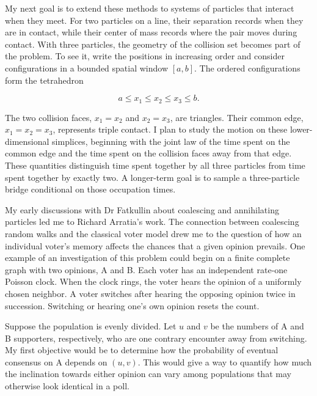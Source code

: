 \documentclass[12pt,letterpaper]{article}
\begin{document}
\newpage
My next goal is to extend these methods to systems of particles that interact when they meet. For two particles on a line, their separation records when they are in contact, while their center of mass records where the pair moves during contact. With three particles, the geometry of the collision set becomes part of the problem. To see it, write the positions in increasing order and consider configurations in a bounded spatial window \([a,b]\). The ordered configurations form the tetrahedron

\[
a\leq x_1\leq x_2\leq x_3\leq b.
\]

The two collision faces, \(x_1=x_2\) and \(x_2=x_3\), are triangles. Their common edge, \(x_1=x_2=x_3\), represents triple contact. I plan to study the motion on these lower-dimensional simplices, beginning with the joint law of the time spent on the common edge and the time spent on the collision faces away from that edge. These quantities distinguish time spent together by all three particles from time spent together by exactly two. A longer-term goal is to sample a three-particle bridge conditional on those occupation times.

My early discussions with Dr Fatkullin about coalescing and annihilating particles led me to Richard Arratia's work. The connection between coalescing random walks and the classical voter model drew me to the question of how an individual voter's memory affects the chances that a given opinion prevails. One example of an investigation of this problem could begin on a finite complete graph with two opinions, A and B. Each voter has an independent rate-one Poisson clock. When the clock rings, the voter hears the opinion of a uniformly chosen neighbor. A voter switches after hearing the opposing opinion twice in succession. Switching or hearing one's own opinion resets the count.

Suppose the population is evenly divided. Let \(u\) and \(v\) be the numbers of A and B supporters, respectively, who are one contrary encounter away from switching. My first objective would be to determine how the probability of eventual consensus on A depends on \((u,v)\). This would give a way to quantify how much the inclination towards either opinion can vary among populations that may otherwise look identical in a poll.
\end{document}
